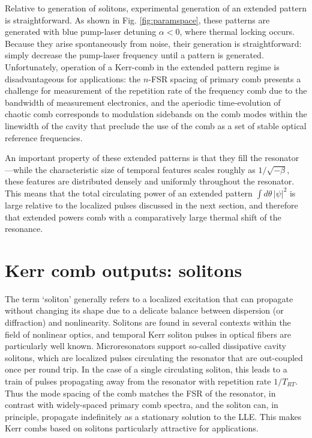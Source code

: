{Relative to generation of solitons, experimental generation of an extended pattern is straightforward. As shown in Fig. \ref{fig:paramspace}, these patterns are generated with blue pump-laser detuning $\alpha<0$, where thermal locking occurs. Because they arise spontaneously from noise, their generation is straightforward: simply decrease the pump-laser frequency until a pattern is generated. Unfortunately, operation of a Kerr-comb in the extended pattern regime is disadvantageous for applications: the $n$-FSR spacing of primary comb presents a challenge for measurement of the repetition rate of the frequency comb due to the bandwidth of measurement electronics, and the aperiodic time-evolution of chaotic comb corresponds to modulation sidebands on the comb modes within the linewidth of the cavity that preclude the use of the comb as a set of stable optical reference frequencies. 

An important property of these extended patterns is that they fill the resonator---while the characteristic size of temporal features scales roughly as $1/\sqrt{-\beta}$, these features are distributed densely and uniformly throughout the resonator. This means that the total circulating power of an extended pattern $\int d\theta\, |\psi|^2$ is large relative to the localized pulses discussed in the next section, and therefore that extended powers comb with a comparatively large thermal shift of the resonance. 



\section{Kerr comb outputs: solitons} \label{sec:LLEsolitons}

The term `soliton' generally refers to a localized excitation that can propagate without changing its shape due to a delicate balance between dispersion (or diffraction) and nonlinearity. Solitons are found in several contexts within the field of nonlinear optics, and temporal Kerr soliton pulses in optical fibers are particularly well known. Microresonators support so-called dissipative cavity solitons, which are localized pulses circulating the resonator that are out-coupled once per round trip. In the case of a single circulating soliton, this leads to a train of pulses propagating away from the resonator with repetition rate $1/T_{RT}$. Thus the mode spacing of the comb matches the FSR of the resonator, in contrast with widely-spaced primary comb spectra, and the soliton can, in principle, propagate indefinitely as a stationary solution to the LLE. This makes Kerr combs based on solitons particularly attractive for applications.

}

